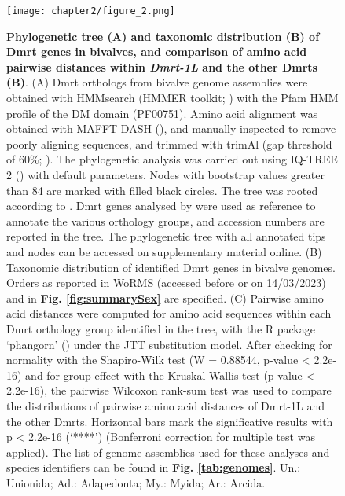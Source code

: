 \begin{figure}[t]
	\centering
	\texttt{[image: chapter2/figure\_2.png]}
	\captionsetup{width=\textwidth}
	\caption{
		\textbf{Phylogenetic tree (A) and taxonomic distribution (B) of Dmrt genes in bivalves, and comparison of amino acid pairwise distances within \textit{Dmrt-1L} and the other Dmrts (B)}. (A) Dmrt orthologs from bivalve genome assemblies were obtained with HMMsearch (HMMER toolkit; \textbf{\cite{eddy2011accelerated}}) with the Pfam HMM profile of the DM domain (PF00751). Amino acid alignment was obtained with MAFFT-DASH (\textbf{\cite{rozewicki2019mafft}}), and manually inspected to remove poorly aligning sequences, and trimmed with trimAl (gap threshold of 60\%; \textbf{\cite{capella2009trimal}}). The phylogenetic analysis was carried out using IQ-TREE 2 (\textbf{\cite{minh2020iq}}) with default parameters. Nodes with bootstrap values greater than 84 are marked with filled black circles. The tree was rooted according to \textbf{\cite{evensen2022comparative}}. Dmrt genes analysed by \textbf{\cite{evensen2022comparative}} were used as reference to annotate the various orthology groups, and accession numbers are reported in the tree. The phylogenetic tree with all annotated tips and nodes can be accessed on supplementary material online. (B) Taxonomic distribution of identified Dmrt genes in bivalve genomes. Orders as reported in WoRMS (accessed before or on 14/03/2023) and in \textbf{Fig. \ref{fig:summarySex}} are specified. (C) Pairwise amino acid distances were computed for amino acid sequences within each Dmrt orthology group identified in the tree, with the R package ‘phangorn’ (\textbf{\cite{schliep2011phangorn}}) under the JTT substitution model. After checking for normality with the Shapiro-Wilk test (W = 0.88544, p-value < 2.2e-16) and for group effect with the Kruskal-Wallis test (p-value < 2.2e-16), the pairwise Wilcoxon rank-sum test was used to compare the distributions of pairwise amino acid distances of Dmrt-1L and the other Dmrts. Horizontal bars mark the significative results with p < 2.2e-16 (‘****’) (Bonferroni correction for multiple test was applied). The list of genome assemblies used for these analyses and species identifiers can be found in \textbf{Fig. \ref{tab:genomes}}. Un.: Unionida; Ad.: Adapedonta; My.: Myida; Ar.: Arcida.
	}

	\label{fig:dmrt}
\end{figure}

